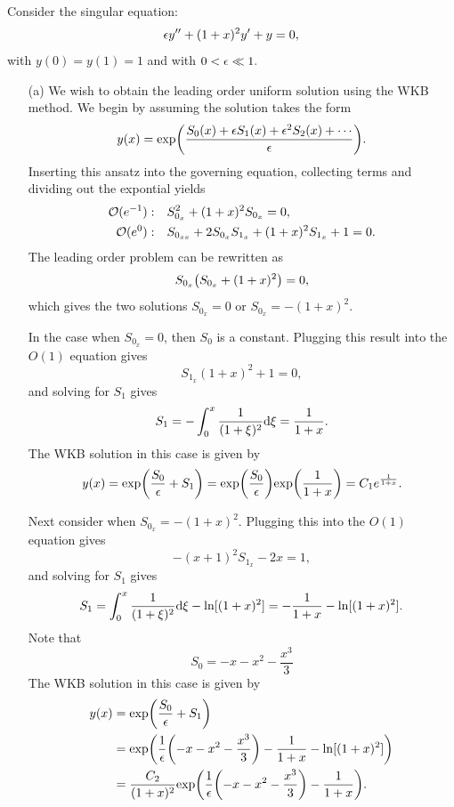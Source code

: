 \documentclass[12pt]{report}
\begin{document}
\begin{solution}

    \noindent
    Consider the singular equation:
    \[ 
        {\epsilon} y'' + (1+x)^2y' + y = 0,
    \]
    with $y(0) = y(1) = 1$ and with $0< {\epsilon} \ll 1.$

    \begin{enumerate}
        \item [(a)]
        We wish to obtain the leading order uniform solution using the WKB method. We begin by assuming the solution takes the form
        \[ 
            y(x) = \text{exp} {\left( \frac{S_0(x) + {\epsilon}S_1(x) + {\epsilon}^2 S_2(x) + \cdots}{{\epsilon}} \right)}.
        \]
        Inserting this ansatz into the governing equation, collecting terms and dividing out the expontial yields
        \begin{align*}
            {\mathcal{O}}(e^{-1}):& ~~~ S_{0_x}^2 + (1 + x)^2S_{0_x} = 0,\\
            {\mathcal{O}}(e^{0}):& ~~~ S_{0_{xx}} + 2S_{0_x}S_{1_x} + (1  + x)^2S_{1_{x}} + 1 = 0.
        \end{align*}
        The leading order problem can be rewritten as
        \[ 
            S_{0_x} {\left(S_{0_x} + (1 + x)^2\right)} = 0,
        \]
        which gives the two solutions $S_{0_x} = 0$ or $S_{0_x} = - (1 + x)^2$. 

        \noindent
        In the case when $S_{0_x} = 0$, then $S_0$ is a constant. Plugging this result into the $O(1)$ equation gives
        \[ 
            S_{1_x}(1 + x)^2 + 1 = 0,
        \]
        and solving for $S_1$ gives
        \[ 
            S_1 = - \int_0^x \frac{1}{(1+\xi)^2} \mathrm{d}\xi = \frac{1}{1 + x}.
        \]
        The WKB solution in this case is given by
        \[ 
            y(x) = \text{exp}{\left(\frac{S_0}{{\epsilon}} + S_1\right)} = \text{exp} {\left(\frac{S_0}{{\epsilon}}\right)}\text{exp}{\left(\frac{1}{1 + x}\right)} = C_1 e^{\frac{1}{1 + x}}.
        \]

        \noindent
        Next consider when $S_{0_x} = - (1 + x)^2$. Plugging this into the $O(1)$ equation gives
        \[ 
            - (x+1)^2S_{1_x} -2 x = 1,
        \]
        and solving for $S_1$ gives
        \[ 
            S_1 = \int_0^x \frac{1}{(1 + \xi)^2} \mathrm{d}\xi - \ln[(1 + x)^2] = -\frac{1}{1+x} - \ln[(1 + x)^2].
        \]
        Note that
        \[ 
            S_0 = -x - x^2 - \frac{x^3}{3}
        \]
        The WKB solution in this case is given by
        \begin{align*}
            y(x) &= \text{exp}{\left(\frac{S_0}{{\epsilon}} + S_1\right)}\\
            &= \text{exp}{\left(\frac{1}{{\epsilon}}{\left(-x - x^2 - \frac{x^3}{3}\right)} -\frac{1}{1+x} - \ln[(1 + x)^2]\right)}\\
            &= \frac{C_2}{(1+x)^2}\text{exp}{\left(\frac{1}{{\epsilon}}{\left(-x - x^2 - \frac{x^3}{3}\right)} -\frac{1}{1+x}\right)}.
        \end{align*}


\end{enumerate}
\end{solution}
\end{document}
